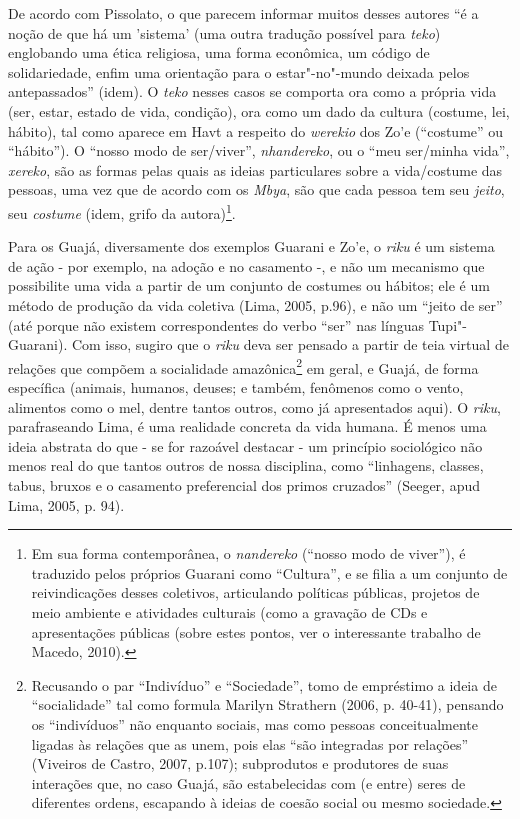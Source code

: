 De acordo com Pissolato, o que parecem informar muitos desses autores ``é
a noção de que há um 'sistema' (uma outra tradução possível para
\emph{teko}) englobando uma ética religiosa, uma forma econômica, um
código de solidariedade, enfim uma orientação para o estar"-no"-mundo
deixada pelos antepassados'' (idem). O \emph{teko} nesses casos se
comporta ora como a própria vida (ser, estar, estado de vida, condição),
ora como um dado da cultura (costume, lei, hábito), tal como aparece em
Havt a respeito do \emph{werekio} dos Zo'e (``costume'' ou ``hábito''). O
``nosso modo de ser/viver'', \emph{nhandereko}, ou o ``meu ser/minha vida'',
\emph{xereko}, são as formas pelas quais as ideias particulares sobre a
vida/costume das pessoas, uma vez que de acordo com os \emph{Mbya}, são
que cada pessoa tem seu \emph{jeito}, seu \emph{costume} (idem, grifo da
autora)\footnote{Em sua forma contemporânea, o \emph{nandereko} (``nosso
  modo de viver''), é traduzido pelos próprios Guarani como ``Cultura'', e
  se filia a um conjunto de reivindicações desses coletivos, articulando
  políticas públicas, projetos de meio ambiente e atividades culturais
  (como a gravação de CDs e apresentações públicas (sobre estes pontos,
  ver o interessante trabalho de Macedo, 2010).}.

Para os Guajá, diversamente dos exemplos Guarani e Zo'e, o \emph{riku} é
um sistema de ação - por exemplo, na adoção e no casamento -, e não um
mecanismo que possibilite uma vida a partir de um conjunto de costumes
ou hábitos; ele é um método de produção da vida coletiva (Lima, 2005,
p.96), e não um ``jeito de ser'' (até porque não existem correspondentes
do verbo ``ser'' nas línguas Tupi"-Guarani). Com isso, sugiro que o
\emph{riku} deva ser pensado a partir de teia virtual de relações que
compõem a socialidade amazônica\footnote{Recusando o par ``Indivíduo'' e
  ``Sociedade'', tomo de empréstimo a ideia de ``socialidade'' tal como
  formula Marilyn Strathern (2006, p. 40-41), pensando os ``indivíduos''
  não enquanto sociais, mas como pessoas conceitualmente ligadas às
  relações que as unem, pois elas ``são integradas por relações''
  (Viveiros de Castro, 2007, p.107); subprodutos e produtores de suas
  interações que, no caso Guajá, são estabelecidas com (e entre) seres
  de diferentes ordens, escapando à ideias de coesão social ou mesmo
  sociedade.} em geral, e Guajá, de forma específica (animais, humanos,
deuses; e também, fenômenos como o vento, alimentos como o mel, dentre
tantos outros, como já apresentados aqui). O \emph{riku}, parafraseando
Lima, é uma realidade concreta da vida humana. É menos uma ideia
abstrata do que - se for razoável destacar - um princípio sociológico
não menos real do que tantos outros de nossa disciplina, como
``linhagens, classes, tabus, bruxos e o casamento preferencial dos primos
cruzados'' (Seeger, apud Lima, 2005, p. 94).

